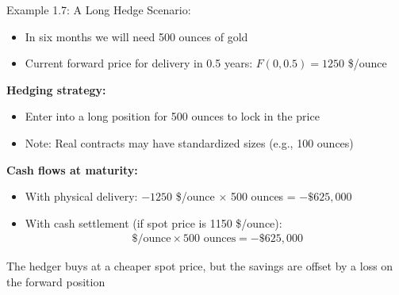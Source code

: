 \documentclass[10pt]{beamer}
\begin{document}
\begin{frame}{Example 1.7: A Long Hedge}
  Scenario:
  \begin{itemize}
    \item In six months we will need 500 ounces of gold
    \item Current forward price for delivery in 0.5 years: $F(0, 0.5) = 1250$ \$/ounce
  \end{itemize}
  
  \pause
  \textbf{Hedging strategy:}
  \begin{itemize}
    \item Enter into a long position for 500 ounces to lock in the price
    \item Note: Real contracts may have standardized sizes (e.g., 100 ounces)
  \end{itemize}
  
  \pause
  \textbf{Cash flows at maturity:}
  \begin{itemize}
    \item With physical delivery: $-1250$ \$/ounce $\times$ 500 ounces = $-\$625,000$
    
    \item With cash settlement (if spot price is 1150 \$/ounce):
    \begin{align*}
      [(1150 - 1250) - 1150]\text{ \$/ounce} \times 500\text{ ounces} = -\$625,000
    \end{align*}
  \end{itemize}
  
  \pause
  The hedger buys at a cheaper spot price, but the savings are offset by a loss on the forward position
\end{frame}
\end{document}
